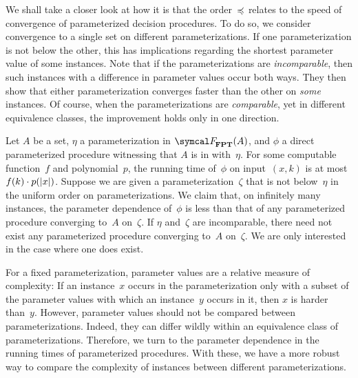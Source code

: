 \begin{example}
\label{ex:comparing_parameterizations}%
  We shall take a closer look at how it is that the order~$\preccurlyeq$ relates to the speed of convergence of parameterized decision procedures.
  To do so, we consider convergence to a single set on different parameterizations.
  If one parameterization is not below the other, this has implications regarding the shortest parameter value of some instances.
  Note that if the parameterizations are \emph{incomparable}, then such instances with a difference in parameter values occur both ways.
  They then show that either parameterization converges faster than the other on \emph{some} instances.
  Of course, when the parameterizations are \emph{comparable}, yet in different equivalence classes, the improvement holds only in one direction.

  Let $A$ be a set, $\eta$ a parameterization in $\calF_\cl{FPT}(A)$, and $\phi$ a direct parameterized procedure witnessing that $A$ is in  with~$\eta$.
  For some computable function~$f$ and polynomial~$p$, the running time of~$\phi$ on input~$(x, k)$ is at most $f(k) \cdot p({\lvert x\rvert})$.
  Suppose we are given a parameterization~$\zeta$ that is not below~$\eta$ in the uniform order on parameterizations.
  We claim that, on infinitely many instances, the parameter dependence of~$\phi$ is less than that of any parameterized procedure converging to~$A$ on~$\zeta$.
  If $\eta$ and~$\zeta$ are incomparable, there need not exist any parameterized procedure converging to~$A$ on~$\zeta$.
  We are only interested in the case where one does exist.

  For a fixed parameterization, parameter values are a relative measure of complexity:
  If an instance~$x$ occurs in the parameterization only with a subset of the parameter values with which an instance~$y$ occurs in it, then $x$ is harder than~$y$.
  However, parameter values should not be compared between parameterizations.
  Indeed, they can differ wildly within an equivalence class of parameterizations.
  Therefore, we turn to the parameter dependence in the running times of parameterized procedures.
  With these, we have a more robust way to compare the complexity of instances between different parameterizations.


\end{example}

